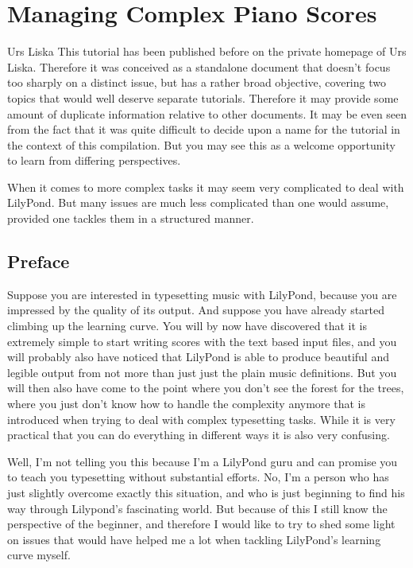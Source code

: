 \documentclass[../LilyPond-Tutorials]{subfiles}
\begin{document}
\chapter{Managing Complex Piano Scores}
\begin{authorAbstract}{Urs Liska}
This tutorial has been published before on the private homepage of Urs Liska. 
Therefore it was conceived as a standalone document that doesn't focus too sharply on a distinct issue, but has a rather broad objective, covering two topics that would well deserve separate tutorials.
Therefore it may provide some amount of duplicate information relative to other documents. It may be even seen from the fact that it was quite difficult to decide upon a name for the tutorial in the context of this compilation.
But you may see this as a welcome opportunity to learn from differing perspectives.

When it comes to more complex tasks it may seem very complicated to deal with LilyPond.
But many issues are much less complicated than one would assume, provided one tackles them in a structured manner.
\end{authorAbstract}

\section*{Preface}

Suppose you are interested in typesetting music with LilyPond, because you are impressed by the quality of its output. 
And suppose you have already started climbing up the learning curve. 
You will by now have discovered that it is extremely simple to start writing scores with the text based input files, and you will probably also have noticed that LilyPond is able to produce beautiful and legible output from not more than just just the plain music definitions. 
But you will then also have come to the point where you don't see the forest for the trees, where you just don't know how to handle the complexity anymore that is introduced when trying to deal with complex typesetting tasks. 
While it is very practical that you can do everything in different ways it is also very confusing.

Well, I'm not telling you this because I'm a LilyPond guru and can promise you to teach you typesetting without substantial efforts. 
No, I'm a person who has just slightly overcome exactly this situation, and who is just beginning to find his way through Lilypond's fascinating world. 
But because of this I still know the perspective of the beginner, and therefore I would like to try to shed some light on issues that would have helped me a lot when tackling LilyPond's learning curve myself.
\end{document}
